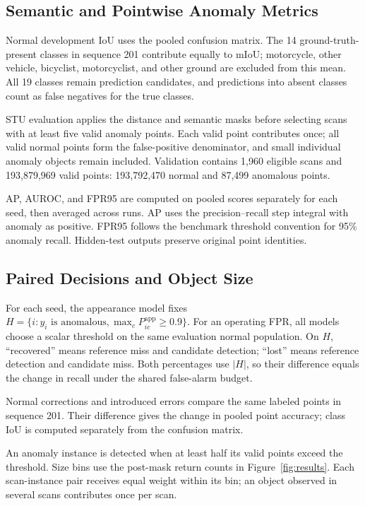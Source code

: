 \documentclass{article}
\begin{document}
\subsection{Semantic and Pointwise Anomaly Metrics}
Normal development IoU uses the pooled confusion matrix. The 14 ground-truth-present classes in sequence 201 contribute equally to mIoU; motorcycle, other vehicle, bicyclist, motorcyclist, and other ground are excluded from this mean. All 19 classes remain prediction candidates, and predictions into absent classes count as false negatives for the true classes.

STU evaluation applies the distance and semantic masks before selecting scans with at least five valid anomaly points. Each valid point contributes once; all valid normal points form the false-positive denominator, and small individual anomaly objects remain included. Validation contains 1,960 eligible scans and 193,879,969 valid points: 193,792,470 normal and 87,499 anomalous points.

AP, AUROC, and FPR95 are computed on pooled scores separately for each seed, then averaged across runs. AP uses the precision--recall step integral with anomaly as positive. FPR95 follows the benchmark threshold convention for 95\% anomaly recall. Hidden-test outputs preserve original point identities.

\subsection{Paired Decisions and Object Size}
For each seed, the appearance model fixes $H=\{i:y_i\text{ is anomalous},\max_cP^{\mathrm{app}}_{ic}\geq0.9\}$. For an operating FPR, all models choose a scalar threshold on the same evaluation normal population. On $H$, ``recovered'' means reference miss and candidate detection; ``lost'' means reference detection and candidate miss. Both percentages use $|H|$, so their difference equals the change in recall under the shared false-alarm budget.

Normal corrections and introduced errors compare the same labeled points in sequence 201. Their difference gives the change in pooled point accuracy; class IoU is computed separately from the confusion matrix.

An anomaly instance is detected when at least half its valid points exceed the threshold. Size bins use the post-mask return counts in Figure~\ref{fig:results}. Each scan-instance pair receives equal weight within its bin; an object observed in several scans contributes once per scan.
\end{document}
